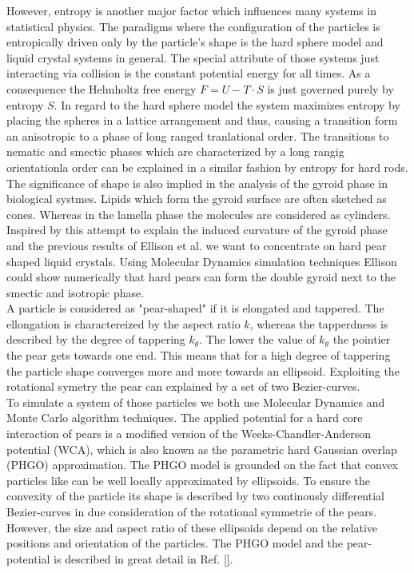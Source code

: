 \documentclass[epj,twocolumn]{webofc}
\begin{document}
However, entropy is another major factor which influences many systems in statistical physics. The paradigms where the configuration of the particles is entropically driven only by the particle's shape is the hard sphere model and 
liquid crystal systems in general. The special attribute of those systems just interacting via collision is the constant potential energy for all times. As a consequence the Helmholtz free energy $F=U-T\cdot S$ is just governed purely 
by entropy $S$. In regard to the hard sphere model the system maximizes entropy by placing the spheres in a lattice arrangement and thus, causing a transition form an anisotropic to a phase of long ranged tranlational order. The 
transitions to nematic and smectic phases which are characterized by a long rangig orientationla order can be explained in a similar fashion by entropy for hard rods.\\

The significance of shape is also implied in the analysis of the gyroid phase in biological systmes. Lipids which form the gyroid surface are often sketched as cones. Whereas in the lamella phase the molecules are considered as
cylinders. Inspired by this attempt to explain the induced curvature of the gyroid phase and the previous results of Ellison et al. \cite{} we want to concentrate on hard pear shaped liquid crystals. Using Molecular Dynamics 
simulation techniques Ellison could show numerically that hard pears can form the double gyroid next to the smectic and isotropic phase.\\

A particle is considered as "pear-shaped" if it is elongated and tappered. The ellongation is charactereized by the aspect ratio $k$, whereas the tapperdness is 
described by the degree of tappering $k_{\theta}$. The lower the value of $k_{\theta}$ the pointier the pear gets towards one end. This means that for a high degree of tappering the particle shape converges more and more towards an
ellipsoid. Exploiting the rotational symetry the pear can explained by a set of two Bezier-curves.\\

To simulate a system of those particles we both use Molecular Dynamics and Monte Carlo algorithm techniques. The applied potential for a hard core interaction of pears is a modified version of the Weeks-Chandler-Anderson potential 
(WCA), which is also known as the parametric hard Gaussian overlap (PHGO) approximation. The PHGO model is grounded on the fact that convex particles like can be well
locally approximated by ellipsoids. To ensure the convexity of the particle its shape is described by two continously differential Bezier-curves in due consideration of the rotational symmetrie of the pears. However, the size and 
aspect ratio of these ellipsoids depend on the relative positions and orientation of the particles. The PHGO model and the pear-potential is described in great detail in Ref. \ref{}.
\end{document}

